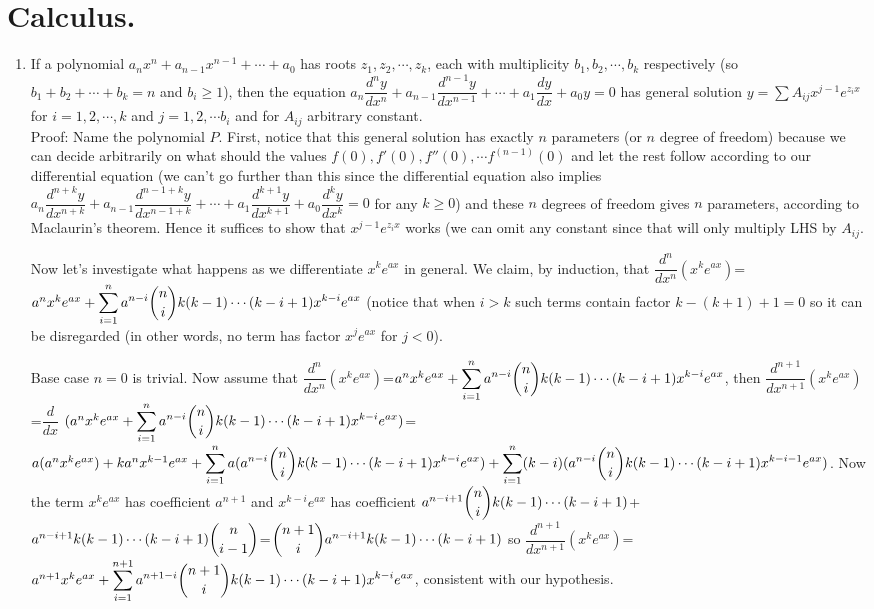 \documentclass[11pt,a4paper]{article}
\begin{document}
\section {Calculus.}
\begin {enumerate}
\item If a polynomial $a_nx^n+a_{n-1}x^{n-1}+\cdots +a_0$ has roots $z_1, z_2, \cdots , z_k$, each with multiplicity $b_1, b_2, \cdots , b_k$ respectively (so $b_1+b_2+\cdots +b_k=n$ and $b_i\ge 1$), then the equation $a_n\dfrac{d^ny}{dx^n}+a_{n-1}\dfrac{d^{n-1}y}{dx^{n-1}}+\cdots +a_1\dfrac{dy}{dx}+a_0y=0$ has general solution $y=\sum A_{ij}x^{j-1}e^{z_ix}$ for $i=1,2,\cdots , k$ and $j=1,2,\cdots b_i$ and for $A_{ij}$ arbitrary constant.\\
Proof: Name the polynomial $P$. First, notice that this general solution has exactly $n$ parameters (or $n$ degree of freedom) because we can decide arbitrarily on what should the values $f(0), f'(0), f''(0),\cdots f^{(n-1)}(0)$ and let the rest follow according to our differential equation (we can't go further than this since the differential equation also implies $a_{n}\dfrac{d^{n+k}y}{dx^{n+k}}+a_{n-1}\dfrac{d^{n-1+k}y}{dx^{n-1+k}}+\cdots +a_1\dfrac{d^{k+1}y}{dx^{k+1}}+a_0\dfrac{d^{k}y}{dx^{k}}=0$ for any $k\ge 0$) and these $n$ degrees of freedom gives $n$ parameters, according to Maclaurin's theorem. Hence it suffices to show that $x^{j-1}e^{z_ix}$ works (we can omit any constant since that will only multiply LHS by $A_{ij}$.

Now let's investigate what happens as we differentiate $x^{k}e^{ax}$ in general. We claim, by induction, that $\dfrac{d^{n}}{dx^{n}}(x^{k}e^{ax})$=$a^{n}x^{k}e^{ax}+\displaystyle\sum_{i=1}^{n} a^{n-i}\dbinom{n}{i} k(k-1)\cdots (k-i+1) x^{k-i}e^{ax}$ (notice that when $i>k$ such terms contain factor $k-(k+1)+1=0$ so it can be disregarded (in other words, no term has factor $x^{j}e^{ax}$ for $j<0$).

Base case $n=0$ is trivial. Now assume that $\dfrac{d^{n}}{dx^{n}}(x^{k}e^{ax})$=$a^{n}x^{k}e^{ax}+\displaystyle\sum_{i=1}^{n} a^{n-i}\dbinom{n}{i} k(k-1)\cdots (k-i+1) x^{k-i}e^{ax}$, then $\dfrac{d^{n+1}}{dx^{n+1}}(x^{k}e^{ax})$=$\dfrac{d}{dx}$  $(a^{n}x^{k}e^{ax}+\displaystyle\sum_{i=1}^{n} a^{n-i}\dbinom{n}{i} k(k-1)\cdots (k-i+1) x^{k-i}e^{ax})$=$a(a^{n}x^{k}e^{ax})+ka^{n}x^{k-1}e^{ax}+\displaystyle\sum_{i=1}^{n}a(a^{n-i}\dbinom{n}{i} k(k-1)\cdots (k-i+1) x^{k-i}e^{ax}) +\displaystyle\sum_{i=1}^{n} (k-i)(a^{n-i}\dbinom{n}{i} k(k-1)\cdots (k-i+1) x^{k-i-1}e^{ax})$. Now the term $x^{k}e^{ax}$ has coefficient $a^{n+1}$ and $x^{k-i}e^{ax}$ has coefficient $a^{n-i+1}\dbinom{n}{i} k(k-1)\cdots (k-i+1)$+ $a^{n-i+1}k(k-1)\cdots (k-i+1)\dbinom{n}{i-1}$=$\dbinom{n+1}{i}a^{n-i+1}k(k-1)\cdots (k-i+1)$ so $\dfrac{d^{n+1}}{dx^{n+1}}(x^{k}e^{ax})$=$a^{n+1}x^{k}e^{ax}+\displaystyle\sum_{i=1}^{n+1}a^{n+1-i}\dbinom{n+1}{i} k(k-1)\cdots (k-i+1) x^{k-i}e^{ax}$, consistent with our hypothesis.


\end{enumerate}
\end{document}
